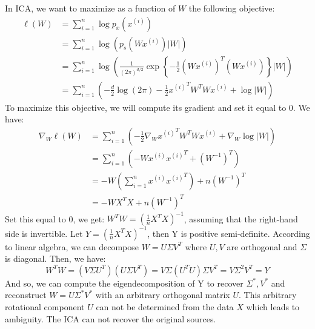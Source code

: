 \begin{answer}
In ICA, we want to maximize as a function of $W$ the following objective:
\begin{align}
	\ell(W) &= \sum_{i=1}^{n} \log p_x(x^{(i)}) \\
	&= \sum_{i=1}^{n} \log(p_s(Wx^{(i)})|W|) \\
	&= \sum_{i=1}^{n} \log \left(\frac{1}{(2\pi)^{d/2}} \exp\left\{-\frac{1}{2}(Wx^{(i)})^T(Wx^{(i)})\right\}|W|\right) \\
	&= \sum_{i=1}^{n} \left(-\frac{d}{2}\log(2\pi) - \frac{1}{2}{x^{(i)}}^T W^T W x^{(i)} + \log|W|\right)
\end{align}
To maximize this objective, we will compute its gradient and set it equal to 0. We have:
\begin{align}
	\nabla_W \ell(W) &= \sum_{i=1}^{n} \left( -\frac{1}{2}\nabla_W{x^{(i)}}^T W^T W x^{(i)} + \nabla_W\log|W|\right) \\
	&= \sum_{i=1}^{n} \left(-Wx^{(i)}{x^{(i)}}^T + {(W^{-1})}^T\right) \\
	&= -W\left(\sum_{i=1}^{n} x^{(i)}{x^{(i)}}^T\right) + n{(W^{-1})}^T \\
	&= -WX^TX + n{(W^{-1})}^T
\end{align}
Set this equal to 0, we get: $W^TW = \left(\frac{1}{n} X^TX\right)^{-1}$, assuming that the right-hand side is invertible. Let $Y = \left(\frac{1}{n} X^TX\right)^{-1}$, then Y is positive semi-definite. According to linear algebra, we can decompose $W = U\Sigma V^T$ where $U, V$ are orthogonal and $\Sigma$ is diagonal. Then, we have: 
$$W^TW = (V\Sigma U^T)(U\Sigma V^T) = V\Sigma (U^TU) \Sigma V^T = V\Sigma^2 V^T = Y$$
And so, we can compute the eigendecomposition of Y to recover $\Sigma^*, V^*$ and reconstruct $W = U\Sigma^* V^*$ with an arbitrary orthogonal matrix $U$. This arbitrary rotational component $U$ can not be determined from the data $X$ which leads to ambiguity. The ICA can not recover the original sources. \\





























\end{answer}
